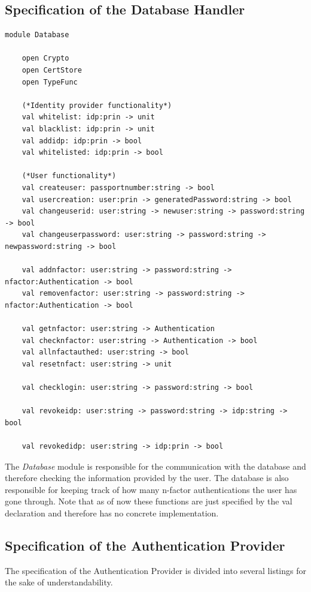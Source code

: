 \documentclass[twosided]{report}
\begin{document}
\subsection{Specification of the Database Handler}
\begin{lstlisting}[style=fstar, caption={Specification of the database}]
	module Database
	
	open Crypto
	open CertStore
	open TypeFunc

	(*Identity provider functionality*)
	val whitelist: idp:prin -> unit
	val blacklist: idp:prin -> unit
	val addidp: idp:prin -> bool
	val whitelisted: idp:prin -> bool

	(*User functionality*)
	val createuser: passportnumber:string -> bool
	val usercreation: user:prin -> generatedPassword:string -> bool
	val changeuserid: user:string -> newuser:string -> password:string -> bool
	val changeuserpassword: user:string -> password:string -> newpassword:string -> bool

	val addnfactor: user:string -> password:string -> nfactor:Authentication -> bool
	val removenfactor: user:string -> password:string -> nfactor:Authentication -> bool

	val getnfactor: user:string -> Authentication
	val checknfactor: user:string -> Authentication -> bool
	val allnfactauthed: user:string -> bool
	val resetnfact: user:string -> unit

	val checklogin: user:string -> password:string -> bool

	val revokeidp: user:string -> password:string -> idp:string -> bool

	val revokedidp: user:string -> idp:prin -> bool
\end{lstlisting}

The \emph{Database} module is responsible for the communication with the database and therefore checking the information provided by the user. The database is also responsible for keeping track of how many n-factor authentications the user has gone through. Note that as of now these functions are just specified by the val declaration and therefore has no concrete implementation.

\clearpage
\subsection{Specification of the Authentication Provider}
The specification of the Authentication Provider is divided into several listings for the sake of understandability.
\end{document}

